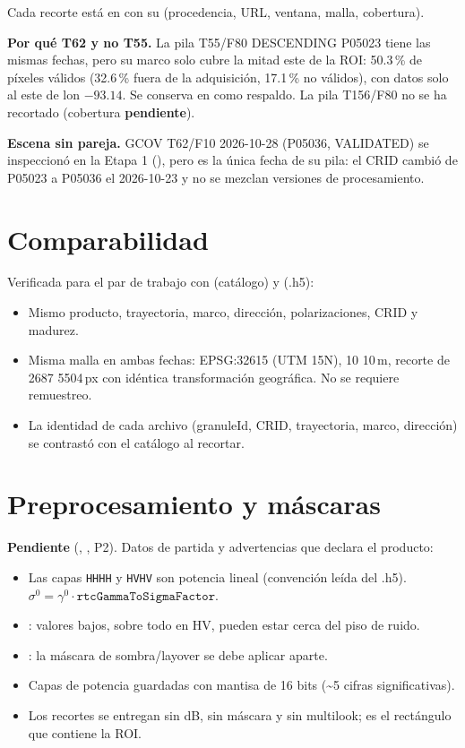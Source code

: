 \documentclass[11pt,a4paper]{article}
\begin{document}
Cada recorte está en  con su  (procedencia, URL, ventana, malla, cobertura).

\textbf{Por qué T62 y no T55.} La pila T55/F80 DESCENDING P05023 tiene las mismas fechas, pero su marco
solo cubre la mitad este de la ROI: 50.3\,\% de píxeles válidos (32.6\,\% fuera de la adquisición,
17.1\,\% no válidos), con datos solo al este de lon \aprox{} $-93.14$. Se conserva en  como respaldo.
La pila T156/F80 no se ha recortado (cobertura \textbf{pendiente}).

\textbf{Escena sin pareja.} GCOV T62/F10 2026-10-28 (P05036, VALIDATED) se inspeccionó en la Etapa 1
(), pero es la única fecha de su pila: el CRID cambió de P05023 a P05036 el 2026-10-23
y no se mezclan versiones de procesamiento.

\section{Comparabilidad}

Verificada para el par de trabajo con  (catálogo) y  (.h5):

\begin{itemize}
  \item Mismo producto, trayectoria, marco, dirección, polarizaciones, CRID y madurez.
  \item Misma malla en ambas fechas: EPSG:32615 (UTM 15N), 10\,\por\,10\,m, recorte de 2687\,\por\,5504\,px con
        idéntica transformación geográfica. No se requiere remuestreo.
  \item La identidad de cada archivo (granuleId, CRID, trayectoria, marco, dirección) se contrastó con el catálogo al recortar.
\end{itemize}

\section{Preprocesamiento y máscaras}

\textbf{Pendiente} (, , P2). Datos de partida y advertencias que declara el producto:

\begin{itemize}
  \item Las capas \texttt{HHHH} y \texttt{HVHV} son potencia lineal \gz{} (convención leída del .h5).
        $\sigma^0 = \gamma^0 \cdot \texttt{rtcGammaToSigmaFactor}$.
  \item {}: valores bajos, sobre todo en HV, pueden estar cerca del piso de ruido.
  \item {}: la máscara de sombra/layover se debe aplicar aparte.
  \item Capas de potencia guardadas con mantisa de 16 bits (\textasciitilde 5 cifras significativas).
  \item Los recortes se entregan sin dB, sin máscara y sin multilook; es el rectángulo que contiene la ROI.
\end{itemize}
\end{document}
